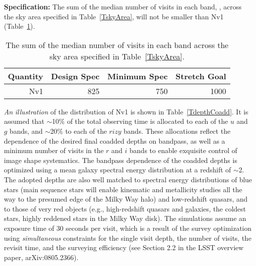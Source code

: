 \textbf{Specification:} The sum of the median number of visits in each
band,
,
across the sky area specified in Table~\ref{TskyArea},
will not be smaller than Nv1 (Table~\ref{Nv1table}).
\begin{table}[h]
\begin{tabular}{|r|r|r|r|}
\hline
 Quantity            & Design Spec & Minimum Spec & Stretch Goal     \\
\hline
     Nv1             &   825   &   750     &    1000     \\
\hline
\end{tabular}
\caption{ The sum of the median number of visits in each
band across the sky area specified in Table~\ref{TskyArea}.}
\label{Nv1table}
\end{table}


\textit{An illustration}
of the distribution of Nv1 is shown in Table~\ref{TdepthCoadd}.
It is assumed that $\sim$10\% of the total observing time is allocated to
each of the $u$ and $g$ bands, and $\sim$20\% to each of the $rizy$ bands. These allocations
reflect the dependence of the desired final coadded depths on bandpass,
as well as a minimum number of visits in the $r$ and $i$ bands to enable
exquisite control of image shape systematics. The bandpass dependence of
the coadded depths is optimized using a mean galaxy spectral energy
distribution at a redshift of $\sim$2. The adopted
depths are also well matched to spectral energy distributions of blue stars
(main sequence stars will enable kinematic and
metallicity studies all the way to the presumed edge of the Milky Way halo)
and low-redshift quasars, and to those of very red objects (e.g., high-redshift
quasars and galaxies, the coldest stars, highly reddened stars in the Milky
Way disk). The simulations assume an exposure time of 30 seconds per visit,
which is a result of the survey optimization using \textit{simultaneous}
constraints for the single visit depth, the number of visits, the revisit
time, and the surveying efficiency (see Section 2.2 in the LSST overview
paper, arXiv:0805.2366).


